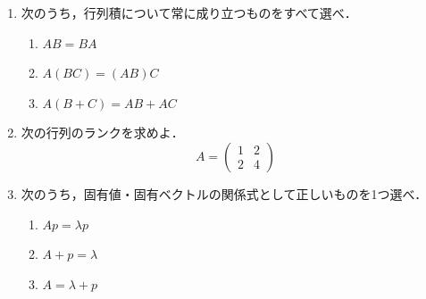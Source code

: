 \documentclass[uplatex,a4paper,12pt]{jsarticle}
\begin{document}
\begin{enumerate}
\item 次のうち，行列積について常に成り立つものをすべて選べ．
\begin{enumerate}[label=(\alph*)]
\item $AB=BA$
\item $A(BC)=(AB)C$
\item $A(B+C)=AB+AC$
\end{enumerate}

\item 次の行列のランクを求めよ．
\[
A=
\begin{pmatrix}
1&2\\
2&4
\end{pmatrix}
\]

\item 次のうち，固有値・固有ベクトルの関係式として正しいものを1つ選べ．
\begin{enumerate}[label=(\alph*)]
\item $Ap=\lambda p$
\item $A+p=\lambda$
\item $A=\lambda+p$
\end{enumerate}

\end{enumerate}
\end{document}
